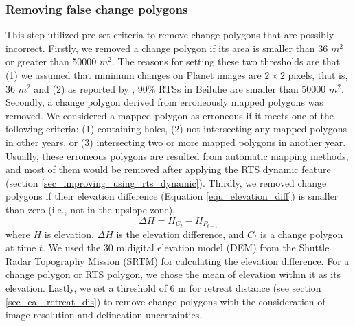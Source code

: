\documentclass[authoryear,preprint,review,12pt]{elsarticle}
\begin{document}
\subsubsection{Removing false change polygons}
\label{sec_removing_false_change}

This step utilized pre-set criteria to remove change polygons that are possibly incorrect. 
Firstly, we removed a change polygon if its area is smaller than 36 $m^2$ or greater than 50000 $m^2$. 
The reasons for setting these two thresholds are that (1) we assumed that minimum changes on Planet images are $2\times2$ pixels, that is, 36 $m^2$ and (2) as reported by \cite{huang2020using}, 90\% RTSs in Beiluhe are smaller than 50000 $m^2$. 
Secondly, a change polygon derived from erroneously mapped polygons was removed.
We considered a mapped polygon as erroneous if it meets one of the following criteria: (1) containing holes, (2) not intersecting any mapped polygons in other years, or (3) intersecting two or more mapped polygons in another year.
Usually, these erroneous polygons are resulted from automatic mapping methods, and most of them would be removed after applying the RTS dynamic feature (section \ref{sec_improving_using_rts_dynamic}). 
Thirdly, we removed change polygons if their elevation difference (Equation \ref{equ_elevation_diff}) is smaller than zero (i.e., not in the upslope zone). 
\begin{equation}
\Delta H = H_{C_{t}} -  H_{P_{t-1}}
\label{equ_elevation_diff}
\end{equation}
where $H$ is elevation, $\Delta H$ is the elevation difference, and $C_{t}$ is a change polygon at time $t$.
We used the 30 m digital elevation model (DEM) from the Shuttle Radar Topography Mission (SRTM) \citep{farr2007shuttle} for calculating the elevation difference. 
For a change polygon or RTS polygon, we chose the mean of elevation within it as its elevation. 
Lastly, we set a threshold of 6 m for retreat distance (see section \ref{sec_cal_retreat_dis}) to remove change polygons with the consideration of image resolution and delineation uncertainties. 
\end{document}

